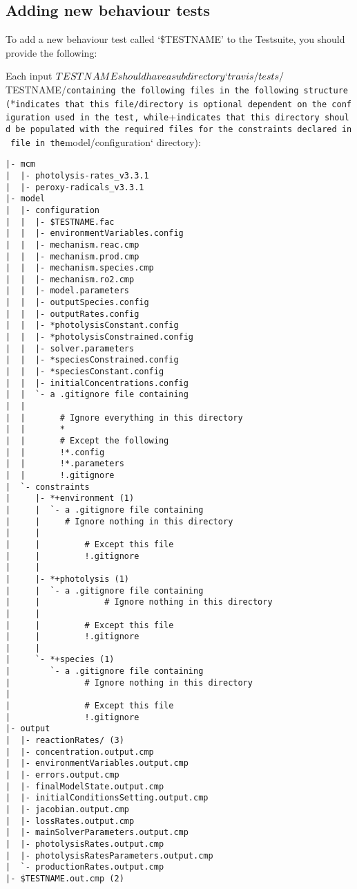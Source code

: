 \subsection{Adding new behaviour tests}\label{adding-new-behaviour-tests}

To add a new behaviour test called `\$TESTNAME' to the Testsuite, you
should provide the following:

Each input
\(TESTNAME should have a subdirectory `travis/tests/\)TESTNAME/\texttt{containing\ the\ following\ files\ in\ the\ following\ structure\ (}*\texttt{indicates\ that\ this\ file/directory\ is\ optional\ dependent\ on\ the\ configuration\ used\ in\ the\ test,\ while}+\texttt{indicates\ that\ this\ directory\ should\ be\ populated\ with\ the\ required\ files\ for\ the\ constraints\ declared\ in\ file\ in\ the}model/configuration`
directory):

\begin{verbatim}
|- mcm
|  |- photolysis-rates_v3.3.1
|  |- peroxy-radicals_v3.3.1
|- model
|  |- configuration
|  |  |- $TESTNAME.fac
|  |  |- environmentVariables.config
|  |  |- mechanism.reac.cmp
|  |  |- mechanism.prod.cmp
|  |  |- mechanism.species.cmp
|  |  |- mechanism.ro2.cmp
|  |  |- model.parameters
|  |  |- outputSpecies.config
|  |  |- outputRates.config
|  |  |- *photolysisConstant.config
|  |  |- *photolysisConstrained.config
|  |  |- solver.parameters
|  |  |- *speciesConstrained.config
|  |  |- *speciesConstant.config
|  |  |- initialConcentrations.config
|  |  `- a .gitignore file containing 
|  |
|  |       # Ignore everything in this directory
|  |       *
|  |       # Except the following
|  |       !*.config
|  |       !*.parameters
|  |       !.gitignore
|  `- constraints
|     |- *+environment (1)
|     |  `- a .gitignore file containing
|     |     # Ignore nothing in this directory
|     |
|     |         # Except this file
|     |         !.gitignore
|     |
|     |- *+photolysis (1)
|     |  `- a .gitignore file containing
|     |             # Ignore nothing in this directory
|     |
|     |         # Except this file
|     |         !.gitignore
|     |
|     `- *+species (1)
|        `- a .gitignore file containing
|               # Ignore nothing in this directory
|
|               # Except this file
|               !.gitignore
|- output
|  |- reactionRates/ (3)
|  |- concentration.output.cmp
|  |- environmentVariables.output.cmp
|  |- errors.output.cmp
|  |- finalModelState.output.cmp
|  |- initialConditionsSetting.output.cmp
|  |- jacobian.output.cmp
|  |- lossRates.output.cmp
|  |- mainSolverParameters.output.cmp
|  |- photolysisRates.output.cmp
|  |- photolysisRatesParameters.output.cmp
|  `- productionRates.output.cmp
|- $TESTNAME.out.cmp (2)
\end{verbatim}


